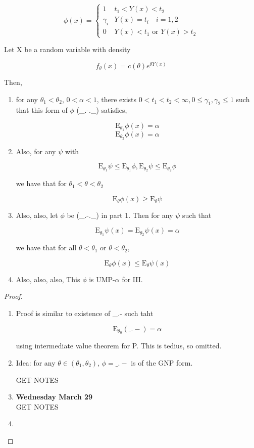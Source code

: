 \documentclass[11pt,fleqn]{book} %
\newcommand{\E}{\mathrm{E}}
\begin{document}
		$$\phi(x) = \left\{ \begin{array}{ll}
			1 & t_1 < Y(x) < t_2\\
			\gamma_i & Y(x) = t_i \quad i = 1, 2\\
			0 & Y(x) < t_1 \text{ or } Y(x) > t_2
		\end{array} \right. $$


\begin{theorem}[3.6]
	Let X be a random variable with density 

			$$f_\theta (x) = c(\theta)e^{\theta Y(x)} $$

	Then, 

	\begin{enumerate}
		\item for any $\theta_1 < \theta_2$, $0 < \alpha < 1$, there exists $0 < t_1 < t_2 < \infty, 0 \leq \gamma_1, \gamma_2 \leq 1$ such that this form of $\phi$ (\_.-.\_) satisfies, 

			$$\E_{\theta_1} \phi(x) = \alpha $$
			$$\E_{\theta_2} \phi(x) = \alpha $$

		\item Also, for any $\psi$ with 

			$$\E_{\theta_1} \psi \leq \E_{\theta_1}\phi, \E_{\theta_2} \psi \leq \E_{\theta_2}\phi $$

	we have that for $\theta_1 < \theta< \theta_2$

			$$\E_\theta \phi(x) \geq \E_{\theta}\psi $$

		\item Also, also, let $\phi$ be (\_.-.\_) in part 1. Then for any $\psi$ such that

			$$\E_{\theta_1} \psi(x) = \E_{\theta_2} \psi(x) = \alpha $$

	we have that for all $\theta < \theta_1$ or $\theta < \theta_2$,

			$$\E_\theta \phi(x) \leq \E_\theta \psi(x) $$

		\item	Also, also, also, This $\phi$ is UMP-$\alpha$ for III.

	\end{enumerate}
	
	
\end{theorem}


\begin{proof}
	\begin{enumerate}
		\item Proof is similar to existence of \_.- such taht

				$$\E_{\theta_0} (\_.-) = \alpha $$

		using intermediate value theorem for P. This is tedius, so omitted. 
		\item Idea: for any $\theta \in (\theta_1, \theta_2)$, $\phi = \_.-$ is of the GNP form. 

		GET NOTES


		\item \textbf{Wednesday March 29}\\

			GET NOTES
		\item  
	\end{enumerate}
\end{proof}
 
\end{document}
